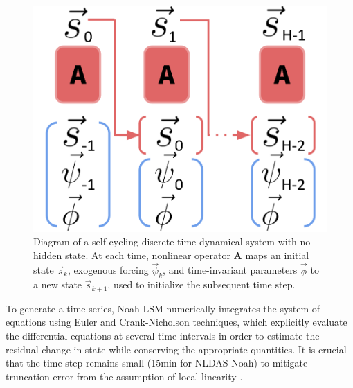 \documentclass[11pt]{article}
\begin{document}
\begin{multicols}{2}
    \begin{figure}[H]
        \centering

        \includegraphics[width=.66\linewidth]{figs/abstract_scann.png}

        \caption{Diagram of a self-cycling discrete-time dynamical system with no hidden state. At each time, nonlinear operator \textbf{A} maps an initial state $\vec{s}_k$, exogenous forcing $\vec{\psi}_k$, and time-invariant parameters $\vec{\phi}$ to a new state $\vec{s}_{k+1}$, used to initialize the subsequent time step.}
        \label{scann}
    \end{figure}

    \vspace{-1.2em}

    To generate a time series, Noah-LSM numerically integrates the system of equations using Euler and Crank-Nicholson techniques, which explicitly evaluate the differential equations at several time intervals in order to estimate the residual change in state while conserving the appropriate quantities. It is crucial that the time step remains small (15min for NLDAS-Noah) to mitigate truncation error from the assumption of local linearity \cite{mitchell_multi-institution_2004}\cite{cartwright_dynamics_1992}.

\end{multicols}
\end{document}
